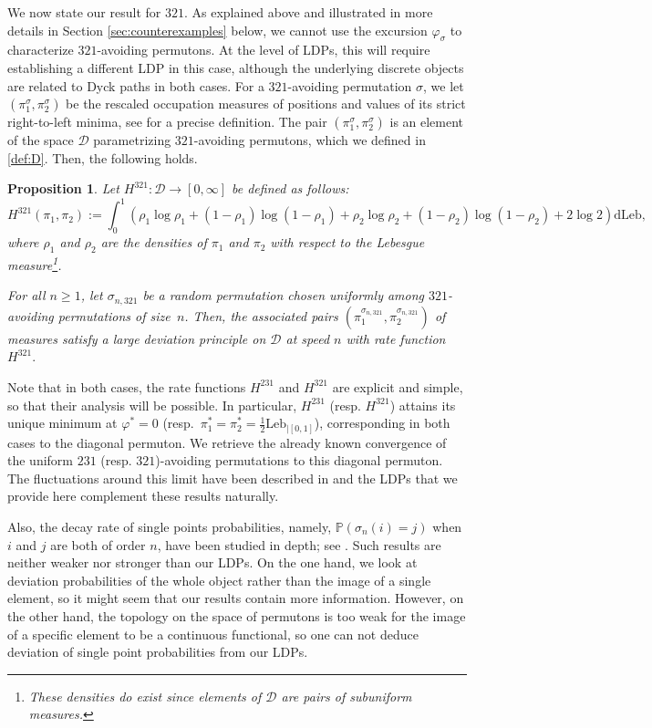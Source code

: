 \documentclass[a4paper,11pt]{amsart}
\newtheorem{prop}[thm]{Proposition}
\theoremstyle{definition}
\begin{document}
We now state our result for $321$.
As explained above and illustrated in more details in Section \ref{sec:counterexamples} below,
we cannot use the excursion $\varphi_\sigma$ to characterize $321$-avoiding permutons. 
At the level of LDPs, this will require establishing a different LDP in this case, although the underlying discrete objects are related to Dyck paths in both cases.
For a $321$-avoiding permutation $\sigma$, we let $(\pi_1^\sigma,\pi_2^\sigma)$ be the rescaled occupation measures of positions and values of its strict right-to-left minima, see  for a precise definition.
The pair $(\pi_1^\sigma,\pi_2^\sigma)$ is an element of the space $\mathcal D$ parametrizing $321$-avoiding permutons, which we defined in \eqref{def:D}.
Then, the following holds.
\begin{prop}\label{prop:LDP_321_pi_intro}
  Let $H^{321}: \mathcal D \rightarrow [0,\infty]$ be defined as follows:
\[
        H^{321}(\pi_1, \pi_2) := \int_0^1 \!\! \left( \rho_1 \log \rho_1 + (1\!-\!\rho_1) \log (1\!-\!\rho_1)
                + \rho_2 \log \rho_2 + (1\!-\!\rho_2) \log (1\!-\!\rho_2) + 2 \log 2 \right) \mathrm{dLeb} ,
    \]
     where $\rho_1$ and $\rho_2$ are the densities of $\pi_1$ and $\pi_2$ with respect to the Lebesgue measure\footnote{
     These densities do exist since elements of $\mathcal D$ are pairs of subuniform measures.
     }.

	For all $n \geq 1$, let $\sigma_{n, 321}$ be a random permutation chosen uniformly among $321$-avoiding permutations of size~$n$.
	Then, the associated pairs $\left( \pi_1^{\sigma_{n, 321}}, \pi_2^{\sigma_{n, 321}} \right)$ of measures
    satisfy a large deviation principle on $\mathcal D$ at speed $n$ with rate function $H^{321}.$
\end{prop}

\medskip

Note that in both cases, the rate functions $H^{231}$ and $H^{321}$ are explicit and simple, so that their analysis will be possible.
In particular, $H^{231}$ (resp. $H^{321}$) attains its unique minimum at $\varphi^* = 0$ (resp.~$\pi_1^* = \pi_2^* = \frac{1}{2} \textrm{Leb}_{|[0,1]}$), corresponding in both cases to the diagonal permuton. 
We retrieve the already known convergence of the uniform $231$ (resp. $321$)-avoiding permutations to this diagonal permuton. 
The fluctuations around this limit have been described in \cite{HoffmanBrownian1} and the  LDPs that we provide here complement these results naturally.

Also, the decay rate of single points probabilities, namely, $\mathbb P(\sigma_n(i)=j)$ when $i$ and $j$ are both of order $n$, have been studied in depth; see \cite{MinerPak,atapour2014largedev}.
Such results are neither weaker nor stronger than our LDPs. 
On the one hand,
we look at deviation probabilities of the whole object rather than the image of a single element, 
so it might seem that our results contain more information. 
However, on the other hand,
the topology on the space of permutons is too weak for the image of a specific element to be a continuous functional,
so one can not deduce deviation of single point probabilities from our LDPs.
\medskip
\end{document}
